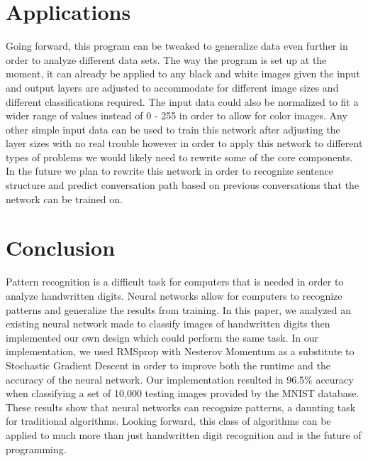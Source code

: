 \documentclass[12pt]{article}
\theoremstyle{definition}
\theoremstyle{plain}
\begin{document}
\section{Applications}
Going forward, this program can be tweaked to generalize data even further in order to analyze different data sets. The way the program is set up at the moment, it can already be applied to any black and white images given the input and output layers are adjusted to accommodate for different image sizes and different classifications required. The input data could also be normalized to fit a wider range of values instead of 0 \-- 255 in order to allow for color images. Any other simple input data can be used to train this network after adjusting the layer sizes with no real trouble however in order to apply this network to different types of problems we would likely need to rewrite some of the core components. In the future we plan to rewrite this network in order to recognize sentence structure and predict conversation path based on previous conversations that the network can be trained on.

\section{Conclusion}
Pattern recognition is a difficult task for computers that is needed in order to analyze handwritten digits. Neural networks allow for computers to recognize patterns and generalize the results from training. In this paper, we analyzed an existing neural network made to classify images of handwritten digits then implemented our own design which could perform the same task. In our implementation, we used RMSprop with Nesterov Momentum as a substitute to Stochastic Gradient Descent in order to improve both the runtime and the accuracy of the neural network. Our implementation resulted in 96.5\% accuracy when classifying a set of 10,000 testing images provided by the MNIST database. These results show that neural networks can recognize patterns, a daunting task for traditional algorithms. Looking forward, this class of algorithms can be applied to much more than just handwritten digit recognition and is the future of programming.

\nocite{*}
\printbibliography
\end{document}
